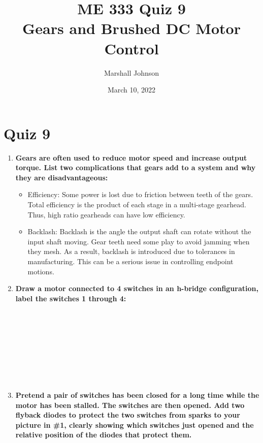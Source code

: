 \documentclass{article}
\title{ME 333 Quiz 9 \\ [1ex] \large Gears and Brushed DC Motor Control}
\author{Marshall Johnson}
\date{March 10, 2022}
\begin{document}
\maketitle

\section*{Quiz 9}

\begin{enumerate}[label=\textbf{\arabic*})]
    \item \textbf{Gears are often used to reduce motor speed and increase output torque. List two 
    complications that gears add to a system and why they are disadvantageous: } \\

    \begin{itemize}
        \item Efficiency: Some power is lost due to friction between teeth of the gears. Total efficiency
        is the product of each stage in a multi-stage gearhead. Thus, high ratio gearheads can have low efficiency.
        \item Backlash: Backlash is the angle the output shaft can rotate without the input shaft moving.
        Gear teeth need some play to avoid jamming when they mesh. As a result, backlash is 
        introduced due to tolerances in manufacturing. This can be a serious issue in controlling endpoint motions.
    \end{itemize}

    \item \textbf{Draw a motor connected to 4 switches in an h-bridge configuration, label the switches 1 
    through 4: } \\
    \\
    \\
    \\
    \\
    \\
    \\
    \\
    \\

    \item \textbf{Pretend a pair of switches has been closed for a long time while the motor has been stalled. 
    The switches are then opened. Add two flyback diodes to protect the two switches from sparks 
    to your picture in \#1, clearly showing which switches just opened and the relative position of 
    the diodes that protect them. } \\
    \\
    \\
    \\
    \\
    \\
    \\
    \\
    \\


\end{enumerate}
\end{document}
